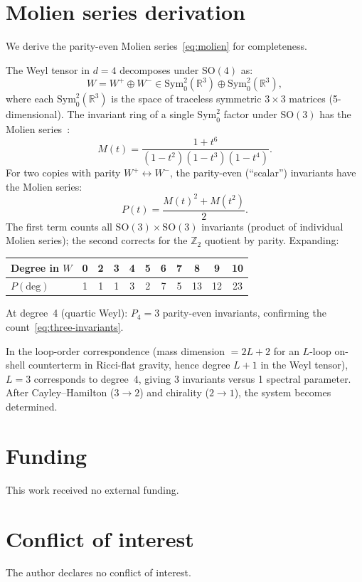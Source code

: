 \documentclass[12pt,a4paper]{article}
\theoremstyle{definition}
\theoremstyle{remark}
\begin{document}
\section{Molien series derivation}
\label{app:molien}

We derive the parity-even Molien series~\eqref{eq:molien} for
completeness.

The Weyl tensor in $d = 4$ decomposes under $\mathrm{SO}(4)$ as:
\begin{equation}
  W = W^+ \oplus W^- \in \mathrm{Sym}_0^2(\mathbb{R}^3)
  \oplus \mathrm{Sym}_0^2(\mathbb{R}^3),
\end{equation}
where each $\mathrm{Sym}_0^2(\mathbb{R}^3)$ is the space of traceless
symmetric $3 \times 3$ matrices (5-dimensional).  The invariant ring of
a single $\mathrm{Sym}_0^2$ factor under $\mathrm{SO}(3)$ has the
Molien series~\cite{Fulling:1992vm}:
\begin{equation}
  M(t) = \frac{1 + t^6}{(1 - t^2)(1 - t^3)(1 - t^4)}.
\end{equation}
For two copies with parity $W^+ \leftrightarrow W^-$, the parity-even
(``scalar'') invariants have the Molien series:
\begin{equation}
  P(t) = \frac{M(t)^2 + M(t^2)}{2}.
\end{equation}
The first term counts all $\mathrm{SO}(3) \times \mathrm{SO}(3)$ invariants
(product of individual Molien series); the second corrects for the
$\mathbb{Z}_2$ quotient by parity.  Expanding:
\begin{center}
\begin{tabular}{l|cccccccccc}
\toprule
Degree in $W$ & 0 & 2 & 3 & 4 & 5 & 6 & 7 & 8 & 9 & 10 \\
\midrule
$P(\text{deg})$ & 1 & 1 & 1 & 3 & 2 & 7 & 5 & 13 & 12 & 23 \\
\bottomrule
\end{tabular}
\end{center}
At degree~4 (quartic Weyl): $P_4 = 3$ parity-even invariants, confirming
the count~\eqref{eq:three-invariants}.

In the loop-order correspondence (mass dimension $= 2L + 2$ for an $L$-loop
on-shell counterterm in Ricci-flat gravity, hence degree $L + 1$ in the
Weyl tensor), $L = 3$ corresponds to degree~4, giving 3 invariants
versus 1 spectral parameter.  After
Cayley--Hamilton ($3 \to 2$) and chirality ($2 \to 1$), the system becomes
determined.


\section*{Funding}

This work received no external funding.

\section*{Conflict of interest}

The author declares no conflict of interest.



\end{document}
